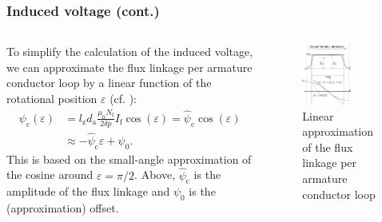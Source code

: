\begin{frame}
	\frametitle{Induced voltage (cont.)}
	\begin{columns}
		\begin{column}{0.55\textwidth}
			To simplify the calculation of the induced voltage, we can approximate the flux linkage per armature conductor loop by a linear function of the rotational position $\varepsilon$ (cf. ):
			\begin{equation}
				\begin{split}
					\psi_\mathrm{c}(\varepsilon) &= l_\mathrm{z} d_\mathrm{a} \frac{\mu_0 N_\mathrm{f}}{2 \delta p} I_\mathrm{f} \cos(\varepsilon) = \hat{\psi}_\mathrm{c} \cos(\varepsilon)\\
									&\approx -\hat{\psi}_\mathrm{c} \varepsilon + \psi_{\mathrm{0}}.
				\end{split}
			\label{eq:Magnetic_flux_linkage_per_conductor_approx}
			\end{equation} 
			This is based on the small-angle approximation of the cosine around $\varepsilon = \pi/2$. Above, $\hat{\psi}_\mathrm{c}$ is the amplitude of the flux linkage and $\psi_{\mathrm{0}}$ is the (approximation) offset. 
	\end{column}
	\hfill
	\begin{column}{0.45\textwidth}
		\begin{figure}
			\centering
			\includegraphics[width=0.65\textwidth]{fig/lec03/Single_coil_flux_linkage_approx.pdf}
			\caption{Linear approximation of the flux linkage per armature conductor loop} 
			\label{fig:Single_coil_flux_linkage_approx}
		\end{figure}
	\end{column}
	\end{columns}
\end{frame}

